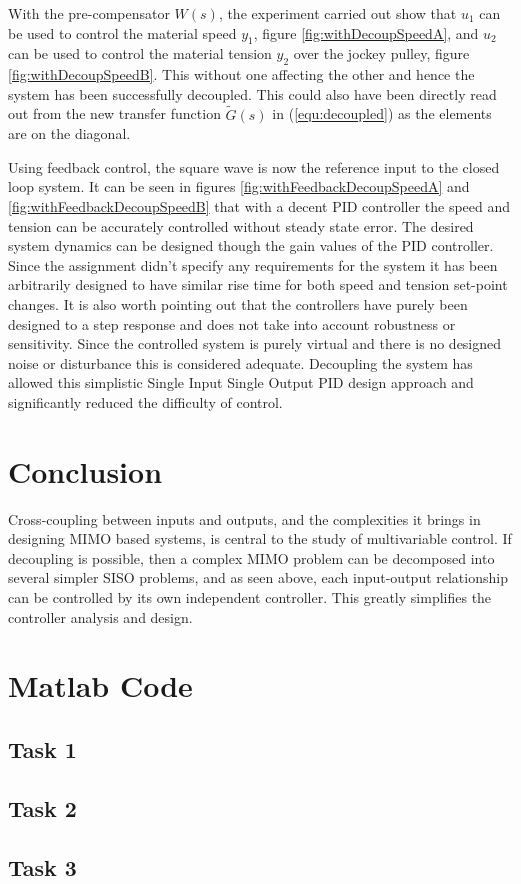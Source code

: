 \documentclass[a4paper, titlepage]{article}
\begin{document}
With the pre-compensator $W(s)$, the experiment carried out show that $u_1$ can be used to control the material speed $y_1$, figure \ref{fig:withDecoupSpeedA}, and $u_2$ can be used to control the material tension $y_2$ over the jockey pulley, figure \ref{fig:withDecoupSpeedB}.
This without one affecting the other and hence the system has been successfully decoupled.
This could also have been directly read out from the new transfer function $\tilde{G}(s)$ in (\ref{equ:decoupled}) as the elements are on the diagonal.

Using feedback control, the square wave is now the reference input to the closed loop system.
It can be seen in figures \ref{fig:withFeedbackDecoupSpeedA} and \ref{fig:withFeedbackDecoupSpeedB} that with a decent PID controller the speed and tension can be accurately controlled without steady state error.
The desired system dynamics can be designed though the gain values of the PID controller.
Since the assignment didn't specify any requirements for the system it has been arbitrarily designed to have similar rise time for both speed and tension set-point changes.
It is also worth pointing out that the controllers have purely been designed to a step response and does not take into account robustness or sensitivity.
Since the controlled system is purely virtual and there is no designed noise or disturbance this is considered adequate.
Decoupling the system has allowed this simplistic Single Input Single Output PID design approach and significantly reduced the difficulty of control.

\section{Conclusion}

Cross-coupling between inputs and outputs, and the complexities it brings in designing MIMO based systems, is central to the study of multivariable control.  
If decoupling is possible, then a complex MIMO problem can be decomposed into several simpler SISO problems, and as seen above, each input-output relationship can be controlled by its own independent controller.  This greatly simplifies the controller analysis and design.   

%

\clearpage
\appendix

\section{Matlab Code}


\subsection{Task 1}

\clearpage

\subsection{Task 2}

\clearpage

\subsection{Task 3}

\clearpage

\clearpage
\end{document}
